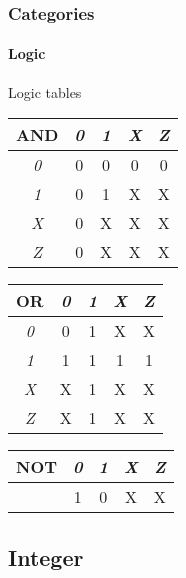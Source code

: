 \begin{frame}
\frametitle{Categories}
\framesubtitle{Logic}

{\scriptsize 
\begin{block}{Logic tables}
\begin{table}
\begin{tabular}{|c|c|c|c|c|}
\hline
{\bfseries AND} & {\em 0} & {\em 1} & {\em X} & {\em Z}  \\
\hline
{\em 0} & 0 & 0 & 0 & 0 \\
\hline
{\em 1} & 0 & 1 & X & X \\
\hline
{\em X} & 0 & X & X & X \\
\hline
{\em Z} & 0 & X & X & X \\
\hline
\end{tabular}
\end{table}
\begin{table}
\begin{tabular}{|c|c|c|c|c|}
\hline
{\bfseries OR} & {\em 0} & {\em 1} & {\em X} & {\em Z}  \\
\hline
{\em 0} & 0 & 1 & X & X \\
\hline
{\em 1} & 1 & 1 & 1 & 1 \\
\hline
{\em X} & X & 1 & X & X \\
\hline
{\em Z} & X & 1 & X & X \\
\hline
\end{tabular}
\end{table}

\begin{table}
\begin{tabular}{|c|c|c|c|c|}
\hline
{\bfseries NOT} & {\em 0} & {\em 1} & {\em X} & {\em Z}  \\
\hline
 & 1 & 0 & X & X \\
\hline
\end{tabular}
\end{table}
\end{block}
}
\end{frame}

\subsection{Integer}

